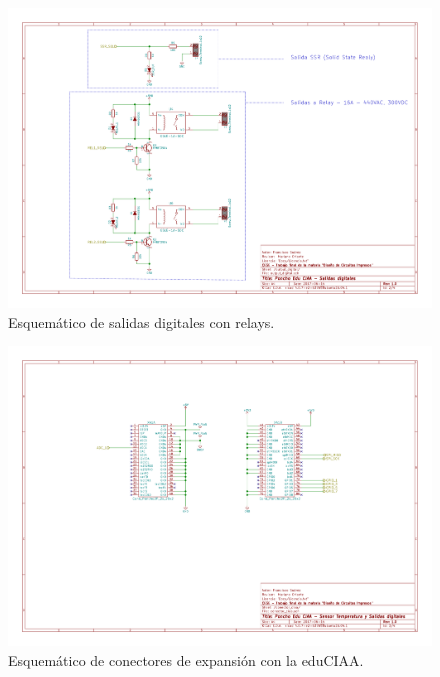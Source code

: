 \begin{figure}
	\centering
	\includegraphics[width=1\textwidth]{Figures/Appendices/sch_outAnalogDigital}
	\caption{Esquemático de salidas digitales con relays.}
	\label{fig:schSalidas}
\end{figure}

\begin{figure}
	\centering
	\includegraphics[width=1\textwidth]{Figures/Appendices/sch_conect_ciaa}
	\caption{Esquemático de conectores de expansión con la eduCIAA.}
	\label{fig:schSalidas}
\end{figure}


